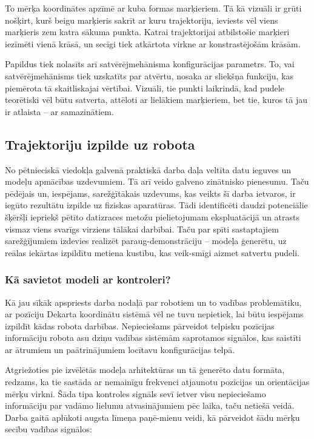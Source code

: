 \documentclass[12pt, a4paper]{article}
\numberwithin{equation}{section} %
\begin{document}
To mērķa koordinātes apzīmē ar kuba formas marķieriem. Tā kā vizuāli ir grūti nošķirt, kurš beigu marķieris sakrīt ar kuru trajektoriju, ieviests vēl viens marķieris zem katra sākuma punkta. Katrai trajektorijai atbilstošie marķieri iezīmēti vienā krāsā, un secīgi tiek atkārtota virkne ar konstrastējošām krāsām. 

Papildus tiek nolasīts arī satvērējmehānisma konfigurācijas parametrs. To, vai satvērējmehānisms tiek uzskatīts par atvērtu, nosaka ar sliekšņa funkciju, kas piemērota tā skaitliskajai vērtībai. Vizuāli, tie punkti laikrindā, kad pudele teorētiski vēl būtu satverta, attēloti ar lielākiem marķieriem, bet tie, kuros tā jau ir atlaista -- ar samazinātiem.
 

\subsection{Trajektoriju izpilde uz robota}

No pētnieciskā viedokļa galvenā praktiskā darba daļa veltīta datu ieguves un modeļu apmācības uzdevumiem. Tā arī veido galveno zinātnisko pienesumu. Taču pēdējais un, iespējams, sarežģītākais uzdevums, kas veikts šī darba ietvaros, ir iegūto rezultātu izpilde uz fiziskas aparatūras. Tādi identificēti daudzi potenciālie šķēršļi iepriekš pētīto datizraces metožu pielietojumam ekspluatācijā un atrasts vismaz viens svarīgs virziens tālākai darbībai. Taču par spīti sastaptajiem sarežģījumiem izdevies realizēt paraug-demonstrāciju -- modeļa ģenerētu, uz reālas iekārtas izpildītu metiena kustību, kas veik-smīgi aizmet satvertu pudeli.

\subsubsection{Kā savietot modeli ar kontroleri?}

Kā jau sīkāk apspriests darba nodaļā par robotiem un to vadības problemātiku, ar pozīciju Dekarta koordinātu sistēmā vēl ne tuvu nepietiek, lai būtu iespējams izpildīt kādas robota darbības. Nepieciešams pārveidot telpisku pozīcijas informāciju robota asu dziņu vadības sistēmām saprotamos signālos, kas saistīti ar ātrumiem un paātrinājumiem locītavu konfigurācijas telpā. 

Atgriežoties pie izvēlētās modeļa arhitektūras un tā ģenerēto datu formāta, redzams, ka tie sastāda ar nemainīgu frekvenci atjaunotu pozīcijas un orientācijas mērķu virkni. Šāda tipa kontroles signāls sevī ietver visu nepieciešamo informāciju par vadāmo lielumu atvasinājumiem pēc laika, taču netiešā veidā. Darba gaitā aplūkoti augsta līmeņa paņē-mienu veidi, kā pārveidot šādu mērķu secību vadības signālos:
\end{document}
